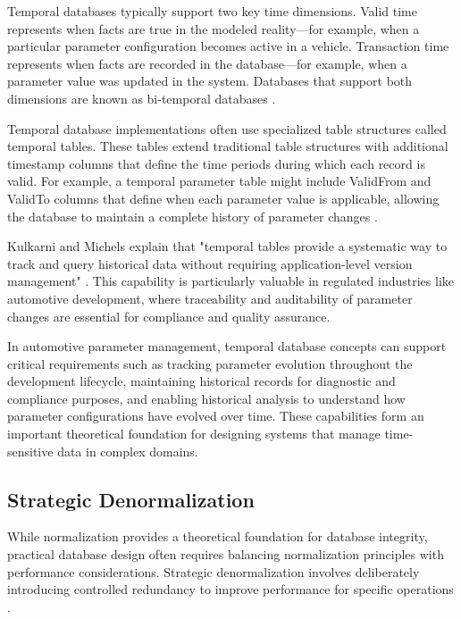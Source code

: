 Temporal databases typically support two key time dimensions. Valid time represents when facts are true in the modeled reality—for example, when a particular parameter configuration becomes active in a vehicle. Transaction time represents when facts are recorded in the database—for example, when a parameter value was updated in the system. Databases that support both dimensions are known as bi-temporal databases \cite{kulkarni2012temporal}.

Temporal database implementations often use specialized table structures called temporal tables. These tables extend traditional table structures with additional timestamp columns that define the time periods during which each record is valid. For example, a temporal parameter table might include ValidFrom and ValidTo columns that define when each parameter value is applicable, allowing the database to maintain a complete history of parameter changes \cite{salzberg1999comparison}.

Kulkarni and Michels explain that "temporal tables provide a systematic way to track and query historical data without requiring application-level version management" \cite{kulkarni2012temporal}. This capability is particularly valuable in regulated industries like automotive development, where traceability and auditability of parameter changes are essential for compliance and quality assurance.

In automotive parameter management, temporal database concepts can support critical requirements such as tracking parameter evolution throughout the development lifecycle, maintaining historical records for diagnostic and compliance purposes, and enabling historical analysis to understand how parameter configurations have evolved over time. These capabilities form an important theoretical foundation for designing systems that manage time-sensitive data in complex domains.

\subsection{Strategic Denormalization}
\label{subsec:strategic-denormalization}

While normalization provides a theoretical foundation for database integrity, practical database design often requires balancing normalization principles with performance considerations. Strategic denormalization involves deliberately introducing controlled redundancy to improve performance for specific operations \cite{bhattacherjee2015principles}.

